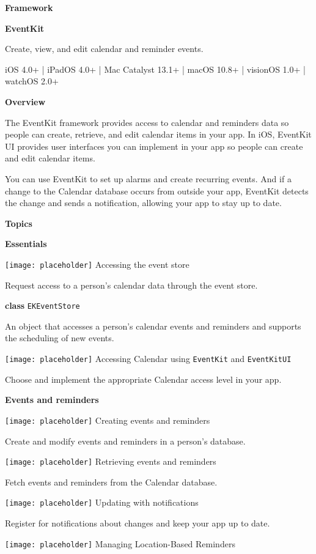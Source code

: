 \documentclass{article}
\title{}
\author{}
\date{}
\begin{document}
\textbf{Framework}

\textbf{EventKit}

Create, view, and edit calendar and reminder events.

iOS 4.0+ | iPadOS 4.0+ | Mac Catalyst 13.1+ | macOS 10.8+ | visionOS 1.0+ | watchOS 2.0+

\textbf{Overview}

The EventKit framework provides access to calendar and reminders data so people can create, retrieve, and edit calendar items in your app. In iOS, EventKit UI provides user interfaces you can implement in your app so people can create and edit calendar items.

You can use EventKit to set up alarms and create recurring events. And if a change to the Calendar database occurs from outside your app, EventKit detects the change and sends a notification, allowing your app to stay up to date.

\textbf{Topics}

\textbf{Essentials}

\texttt{[image: placeholder]} Accessing the event store

Request access to a person's calendar data through the event store.

\textbf{class} \texttt{EKEventStore}

An object that accesses a person's calendar events and reminders and supports the scheduling of new events.

\texttt{[image: placeholder]} Accessing Calendar using \texttt{EventKit} and \texttt{EventKitUI}

Choose and implement the appropriate Calendar access level in your app.

\textbf{Events and reminders}

\texttt{[image: placeholder]} Creating events and reminders

Create and modify events and reminders in a person's database.

\texttt{[image: placeholder]} Retrieving events and reminders

Fetch events and reminders from the Calendar database.

\texttt{[image: placeholder]} Updating with notifications

Register for notifications about changes and keep your app up to date.

\texttt{[image: placeholder]} Managing Location-Based Reminders
\end{document}
